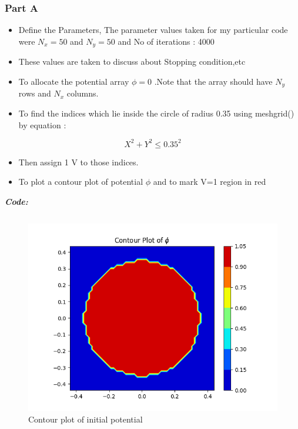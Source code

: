 \documentclass[11pt, a4paper, twoside]{article}
\begin{document}
\subsubsection{Part A}\label{part-a}

\begin{itemize}
\item
  Define the Parameters, The parameter values taken for my particular code were \(N_x = 50\) and \(N_y = 50\) and No of
  iterations : 4000
\item
  These values are taken to discuss about Stopping condition,etc
\item
  To allocate the potential array \(\phi = 0\) .Note that the array
  should have \(N_y\) rows and \(N_x\) columns.
\item
  To find the indices which lie inside the circle of radius 0.35 using
  meshgrid() by equation :
\end{itemize}

\begin{equation}
X ^2 +Y ^2 \leq	 0.35^2
\end{equation}

\begin{itemize}
\item
  Then assign 1 V to those indices.
\item
  To plot a contour plot of potential \(\phi\) and to mark V=1 region in
  red

\end{itemize}

\textit{\textbf{Code:}}
\inputminted[linenos, breaklines]{python}{Code/1.py}
	     \begin{figure}[!tbh]
        \centering
        \includegraphics[scale=0.8]{Plots/Fig1.png}  
        \caption{Contour plot of initial potential}
   \end{figure}
\end{document}
